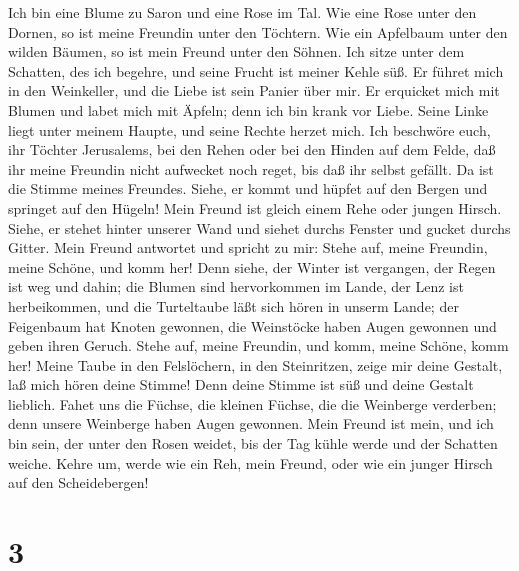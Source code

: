 Ich bin eine Blume zu Saron und eine Rose im Tal.
 Wie eine Rose unter den Dornen, so ist meine Freundin unter
den Töchtern.  Wie ein Apfelbaum unter den wilden Bäumen, so
ist mein Freund unter den Söhnen. Ich sitze unter dem Schatten, des ich
begehre, und seine Frucht ist meiner Kehle süß.  Er führet
mich in den Weinkeller, und die Liebe ist sein Panier über mir.
 Er erquicket mich mit Blumen und labet mich mit Äpfeln;
denn ich bin krank vor Liebe.  Seine Linke liegt unter
meinem Haupte, und seine Rechte herzet mich.  Ich beschwöre
euch, ihr Töchter Jerusalems, bei den Rehen oder bei den Hinden auf dem
Felde, daß ihr meine Freundin nicht aufwecket noch reget, bis daß ihr
selbst gefällt.  Da ist die Stimme meines Freundes. Siehe,
er kommt und hüpfet auf den Bergen und springet auf den Hügeln!
 Mein Freund ist gleich einem Rehe oder jungen Hirsch.
Siehe, er stehet hinter unserer Wand und siehet durchs Fenster und
gucket durchs Gitter.  Mein Freund antwortet und spricht zu
mir: Stehe auf, meine Freundin, meine Schöne, und komm her!
 Denn siehe, der Winter ist vergangen, der Regen ist weg
und dahin;  die Blumen sind hervorkommen im Lande, der Lenz
ist herbeikommen, und die Turteltaube läßt sich hören in unserm Lande;
 der Feigenbaum hat Knoten gewonnen, die Weinstöcke haben
Augen gewonnen und geben ihren Geruch. Stehe auf, meine Freundin, und
komm, meine Schöne, komm her!  Meine Taube in den
Felslöchern, in den Steinritzen, zeige mir deine Gestalt, laß mich hören
deine Stimme! Denn deine Stimme ist süß und deine Gestalt lieblich.
 Fahet uns die Füchse, die kleinen Füchse, die die
Weinberge verderben; denn unsere Weinberge haben Augen gewonnen.
 Mein Freund ist mein, und ich bin sein, der unter den
Rosen weidet,  bis der Tag kühle werde und der Schatten
weiche. Kehre um, werde wie ein Reh, mein Freund, oder wie ein junger
Hirsch auf den Scheidebergen!

\hypertarget{section-2}{%
\section{3}\label{section-2}}


